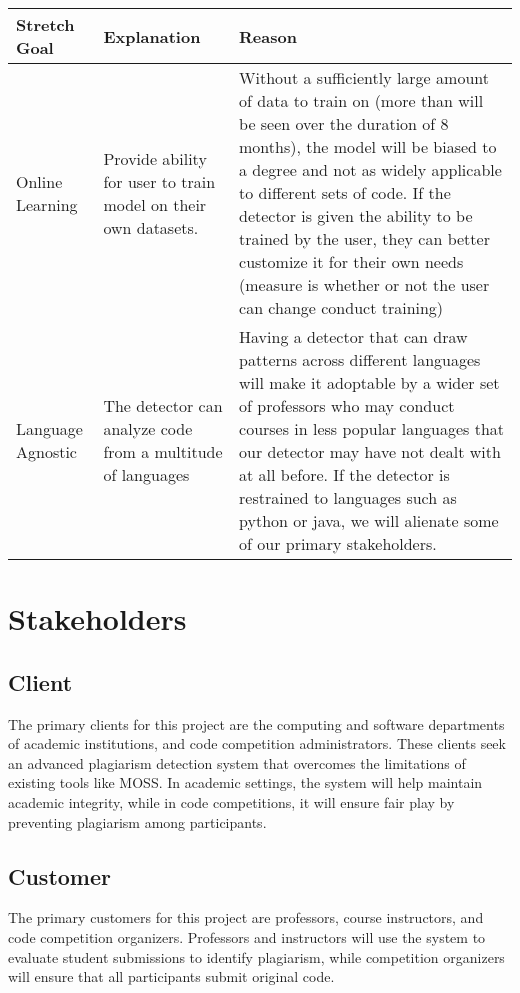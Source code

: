 \documentclass[12pt]{article}
\begin{document}
    
    \begin{center}
      \hspace*{-1cm}
      \begin{tabular}{ 
        | p{3cm} 
        | p{6cm} 
        | p{6cm} | }
      \hline
       Stretch Goal & 
      Explanation & 
      Reason \\
      \hline
      Online Learning & 
      Provide ability for user to train model on their own datasets. & 
      Without a sufficiently large amount of data to train on (more than will be seen over the duration of 8 months), the model will be biased to a degree and not as widely applicable to different sets of code. If the detector is given the ability to be trained by the user, they can better customize it for their own needs (measure is whether or not the user can change conduct training)\\
      \hline
      Language Agnostic & 
      The detector can analyze code from a multitude of languages & 
      Having a detector that can draw patterns across different languages will make it adoptable by a wider set of professors who may conduct courses in less popular languages that our detector may have not dealt with at all before. If the detector is restrained to languages such as python or java, we will alienate some of our primary stakeholders.\\
      \hline
      \end{tabular}
      \end{center}

\section{Stakeholders}

\subsection{Client}
The primary clients for this project are the computing and software departments
of academic institutions, and code competition administrators. These clients
seek an advanced plagiarism detection system that overcomes the limitations of
existing tools like MOSS. In academic settings, the system will help maintain
academic integrity, while in code competitions, it will ensure fair play by
preventing plagiarism among participants.

\subsection{Customer}
The primary customers for this project are professors, course instructors, and
code competition organizers. Professors and instructors will use the system to
evaluate student submissions to identify plagiarism, while competition
organizers will ensure that all participants submit original code. 
\end{document}
